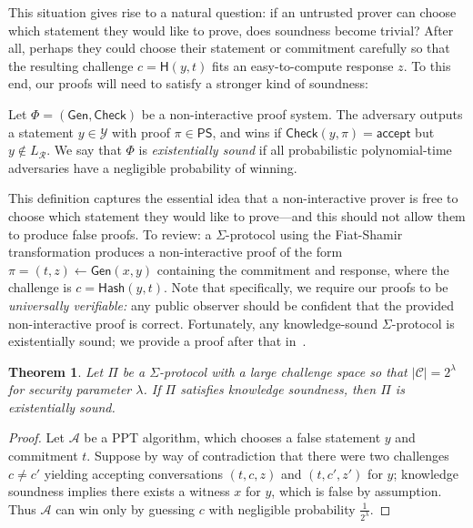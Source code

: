 \documentclass[12pt,a4paper]{article}
\newtheorem{theorem}{Theorem}
\theoremstyle{definition}
\begin{document}
This situation gives rise to a natural question: if an untrusted prover can choose which statement they would like to prove, does soundness become trivial? After all, perhaps they could choose their statement or commitment carefully so that the resulting challenge $c = \mathsf{H}(y, t)$ fits an easy-to-compute response $z$. To this end, our proofs will need to satisfy a stronger kind of soundness:
\newpage
\begin{definition}
    Let $\Phi=(\mathsf{Gen}, \mathsf{Check})$ be a non-interactive proof system. The adversary outputs a statement $y\in\mathcal{Y}$ with proof $\pi\in\mathsf{PS}$, and wins if $\mathsf{Check}(y, \pi)=\mathsf{accept}$ but $y\notin L_\mathcal{R}$. We say that $\Phi$ is \textit{existentially sound} if all probabilistic polynomial-time adversaries have a negligible probability of winning.
\end{definition}

This definition captures the essential idea that a non-interactive prover is free to choose which statement they would like to prove---and this should not allow them to produce false proofs. To review: a $\Sigma$-protocol using the Fiat-Shamir transformation produces a non-interactive proof of the form $\pi = (t, z)\gets\mathsf{Gen}(x, y)$ containing the commitment and response, where the challenge is $c = \mathsf{Hash}(y, t)$. Note that specifically, we require our proofs to be \textit{universally verifiable:} any public observer should be confident that the provided non-interactive proof is correct. Fortunately, any knowledge-sound $\Sigma$-protocol is existentially sound; we provide a proof after that in~\cite{boneh2020graduate}.

\begin{theorem}
    Let $\Pi$ be a $\Sigma$-protocol with a large challenge space so that $|\mathcal{C}| = 2^\lambda$ for security parameter $\lambda$. If $\Pi$ satisfies knowledge soundness, then $\Pi$ is existentially sound.
\end{theorem}
\begin{proof}
    Let $\mathcal{A}$ be a PPT algorithm, which chooses a false statement $y$ and commitment $t$. Suppose by way of contradiction that there were two challenges $c\neq c'$ yielding accepting conversations $(t, c, z)$ and $(t, c', z')$ for $y$; knowledge soundness implies there exists a witness $x$ for $y$, which is false by assumption. Thus $\mathcal{A}$ can win only by guessing $c$ with negligible probability $\frac{1}{2^\lambda}$.
\end{proof}
\end{document}
